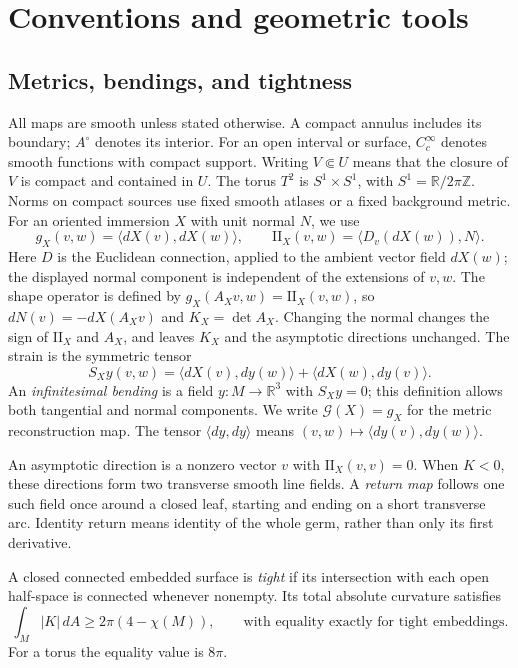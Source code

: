 \documentclass[11pt]{amsart}
\theoremstyle{definition}
\theoremstyle{remark}
\newcommand{\R}{\mathbb R}\newcommand{\Sph}{\mathbb S}
\newcommand{\II}{\mathrm{II}}\newcommand{\Gmap}{\mathcal G}
\numberwithin{equation}{section}
\begin{document}
\section{Conventions and geometric tools}\label{sec:prelim}
\subsection{Metrics, bendings, and tightness}
All maps are smooth unless stated otherwise. A compact annulus includes
its boundary; $A^\circ$ denotes its interior. For an open interval or
surface, $C_c^\infty$ denotes smooth functions with compact support.
Writing $V\Subset U$ means that the closure of $V$ is compact and
contained in $U$. The torus $T^2$ is $S^1\times S^1$, with
$S^1=\R/2\pi\mathbb Z$.
Norms on compact sources use fixed smooth atlases or a fixed background
metric. For an oriented immersion $X$ with unit normal $N$, we use
\[
 g_X(v,w)=\langle dX(v),dX(w)\rangle,\qquad
 \II_X(v,w)=\langle D_v(dX(w)),N\rangle.
\]
Here $D$ is the Euclidean connection, applied to the ambient vector
field $dX(w)$; the displayed normal component is independent of the
extensions of $v,w$. The shape operator is defined by
$g_X(A_Xv,w)=\II_X(v,w)$, so $dN(v)=-dX(A_Xv)$ and $K_X=\det A_X$.
Changing the normal changes the sign of $\II_X$ and $A_X$, and leaves
$K_X$ and the asymptotic directions unchanged. The strain is the symmetric tensor
\[
 S_Xy(v,w)=\langle dX(v),dy(w)\rangle+
             \langle dX(w),dy(v)\rangle.
\]
An \emph{infinitesimal bending} is a field $y:M\to\R^3$ with $S_Xy=0$;
this definition allows both tangential and normal components. We write
$\Gmap(X)=g_X$ for the metric reconstruction map. The tensor
$\langle dy,dy\rangle$ means $(v,w)\mapsto\langle dy(v),dy(w)\rangle$.

An asymptotic direction is a nonzero vector $v$ with $\II_X(v,v)=0$.
When $K<0$, these directions form two transverse smooth line fields.
A \emph{return map} follows one such field once around a closed leaf,
starting and ending on a short transverse arc. Identity return means
identity of the whole germ, rather than only its first derivative.

A closed connected embedded surface is \emph{tight} if its intersection
with each open half-space is connected whenever nonempty. Its total
absolute curvature satisfies \cite[\S1.1]{BK}
\begin{equation}\label{eq:tight-bound}
 \int_M|K|\,dA\ge2\pi(4-\chi(M)),
 \qquad\text{with equality exactly for tight embeddings}.
\end{equation}
For a torus the equality value is $8\pi$.
\end{document}
